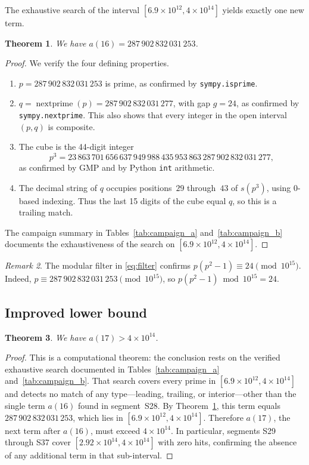 \documentclass[12pt,reqno]{article}
\theoremstyle{plain}
\newtheorem{theorem}{Theorem}
\theoremstyle{definition}
\theoremstyle{remark}
\newtheorem{remark}[theorem]{Remark}
\newcommand{\np}{\operatorname{nextprime}}
\begin{document}
The exhaustive search of the interval $[6.9 \times 10^{12},
4 \times 10^{14}]$ yields exactly one new term.

\begin{theorem}
\label{thm:a16}
We have $a(16) = 287\,902\,832\,031\,253$.
\end{theorem}

\begin{proof}
We verify the four defining properties.
\begin{enumerate}
\item $p = 287\,902\,832\,031\,253$ is prime, as confirmed by
      \texttt{sympy.isprime}.
\item $q = \np(p) = 287\,902\,832\,031\,277$, with gap $g = 24$,
      as confirmed by \texttt{sympy.nextprime}.
      This also shows that every integer in the open interval
      $(p, q)$ is composite.
\item The cube is the 44-digit integer
      \[
      p^3 = 23\,863\,701\,656\,637\,949\,988\,435\,953\,863\,
      287\,902\,832\,031\,277,
      \]
      as confirmed by GMP and by Python \texttt{int} arithmetic.
\item The decimal string of $q$ occupies positions~$29$ through~$43$
      of $s(p^3)$, using 0-based indexing.
      Thus the last 15 digits of the cube equal $q$, so this is a
      trailing match.
\end{enumerate}
The campaign summary in Tables~\ref{tab:campaign_a}
and~\ref{tab:campaign_b} documents the exhaustiveness of the search
on $[6.9 \times 10^{12}, 4 \times 10^{14}]$.
\end{proof}

\begin{remark}
The modular filter in \eqref{eq:filter} confirms
$p(p^2 - 1) \equiv 24 \pmod{10^{15}}$.
Indeed, $p \equiv 287\,902\,832\,031\,253 \pmod{10^{15}}$,
so $p(p^2 - 1) \bmod 10^{15} = 24$.
\end{remark}

\subsection{Improved lower bound}
\label{sec:lowerbound}

\begin{theorem}
\label{thm:a17}
We have $a(17) > 4 \times 10^{14}$.
\end{theorem}

\begin{proof}
This is a computational theorem: the conclusion rests on the verified
exhaustive search documented in Tables~\ref{tab:campaign_a}
and~\ref{tab:campaign_b}.
That search covers every prime in $[6.9 \times 10^{12},
4 \times 10^{14}]$ and detects no match of any type---leading,
trailing, or interior---other than the single term $a(16)$ found in
segment~S28.
By Theorem~\ref{thm:a16}, this term equals
$287\,902\,832\,031\,253$, which lies in
$[6.9 \times 10^{12}, 4 \times 10^{14}]$.
Therefore $a(17)$, the next term after $a(16)$, must exceed
$4 \times 10^{14}$.
In particular, segments S29 through S37 cover
$[2.92 \times 10^{14}, 4 \times 10^{14}]$ with zero hits,
confirming the absence of any additional term in that sub-interval.
\end{proof}
\end{document}
